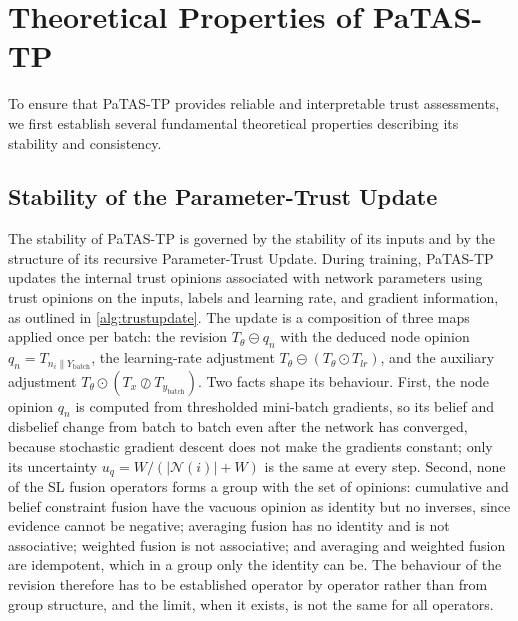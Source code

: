 \section{Theoretical Properties of \ac{PaTAS-TP}}\label{sec:ptastheory}
To ensure that \ac{PaTAS-TP} provides reliable and interpretable trust assessments, we first establish several fundamental theoretical properties describing its stability and consistency.
\subsection{Stability of the Parameter-Trust Update}
\label{sec:ptas_convergence}

The stability of \ac{PaTAS-TP} is governed by the stability of its inputs and by the structure of its recursive Parameter-Trust Update. During training, \ac{PaTAS-TP} updates the internal trust opinions associated with network parameters using trust opinions on the inputs, labels and learning rate, and gradient information, as outlined in \cref{alg:trustupdate}. The update is a composition of three maps applied once per batch: the revision $T_\theta \circleddash q_n$ with the deduced node opinion $q_n = T_{n_i \parallel Y_\text{batch}}$, the learning-rate adjustment $T_\theta \circleddash (T_\theta \odot T_{lr})$, and the auxiliary adjustment $T_\theta \odot (T_x \oslash T_{y_\text{batch}})$. Two facts shape its behaviour. First, the node opinion $q_n$ is computed from thresholded mini-batch gradients, so its belief and disbelief change from batch to batch even after the network has converged, because stochastic gradient descent does not make the gradients constant; only its uncertainty $u_q = W / (|\mathcal{N}(i)| + W)$ is the same at every step. Second, none of the \ac{SL} fusion operators forms a group with the set of opinions: cumulative and belief constraint fusion have the vacuous opinion as identity but no inverses, since evidence cannot be negative; averaging fusion has no identity and is not associative; weighted fusion is not associative; and averaging and weighted fusion are idempotent, which in a group only the identity can be. The behaviour of the revision therefore has to be established operator by operator rather than from group structure, and the limit, when it exists, is not the same for all operators.

